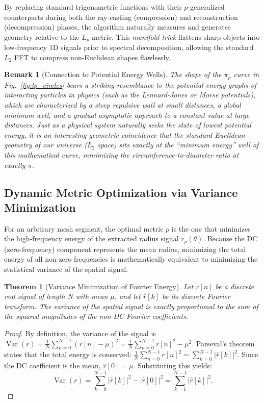 \documentclass[11pt,twoside]{article}
\newtheorem{theorem}{Theorem}
\newtheorem{remark}{Remark}
\begin{document}
By replacing standard trigonometric functions with their $p$-generalized counterparts during both the ray-casting (compression) and reconstruction (decompression) phases, the algorithm naturally measures and generates geometry relative to the $L_p$ metric. This \emph{manifold trick} flattens sharp objects into low-frequency 1D signals prior to spectral decomposition, allowing the standard $L_2$ FFT to compress non-Euclidean shapes flawlessly.

\begin{remark}[Connection to Potential Energy Wells]
	The shape of the $\pi_p$ curve in Fig.~\ref{fig:lp_circles} bears a striking resemblance to the potential energy graphs of interacting particles in physics (such as the Lennard-Jones or Morse potentials), which are characterized by a steep repulsive wall at small distances, a global minimum well, and a gradual asymptotic approach to a constant value at large distances. Just as a physical system naturally seeks the state of lowest potential energy, it is an interesting geometric coincidence that the standard Euclidean geometry of our universe ($L_2$ space) sits exactly at the ``minimum energy'' well of this mathematical curve, minimizing the circumference-to-diameter ratio at exactly $\pi$.
\end{remark}

\subsection{Dynamic Metric Optimization via Variance Minimization}

For an arbitrary mesh segment, the optimal metric $p$ is the one that minimizes the high-frequency energy of the extracted radius signal $r_p(\theta)$. Because the DC (zero-frequency) component represents the mean radius, minimizing the total energy of all non-zero frequencies is mathematically equivalent to minimizing the statistical variance of the spatial signal.

\begin{theorem}[Variance Minimization of Fourier Energy]
Let $r[n]$ be a discrete real signal of length $N$ with mean $\mu$, and let $\hat{r}[k]$ be its discrete Fourier transform. The variance of the spatial signal is exactly proportional to the sum of the squared magnitudes of the non-DC Fourier coefficients.
\end{theorem}
\begin{proof}
By definition, the variance of the signal is $\operatorname{Var}(r) = \frac{1}{N} \sum_{n=0}^{N-1} (r[n] - \mu)^2 = \frac{1}{N} \sum_{n=0}^{N-1} r[n]^2 - \mu^2$.
Parseval's theorem states that the total energy is conserved: $\frac{1}{N} \sum_{n=0}^{N-1} r[n]^2 = \sum_{k=0}^{N-1} |\hat{r}[k]|^2$. 
Since the DC coefficient is the mean, $\hat{r}[0] = \mu$. Substituting this yields:
\begin{equation}
\operatorname{Var}(r) = \sum_{k=0}^{N-1} |\hat{r}[k]|^2 - |\hat{r}[0]|^2 = \sum_{k=1}^{N-1} |\hat{r}[k]|^2.
\end{equation}
\end{proof}
\end{document}
